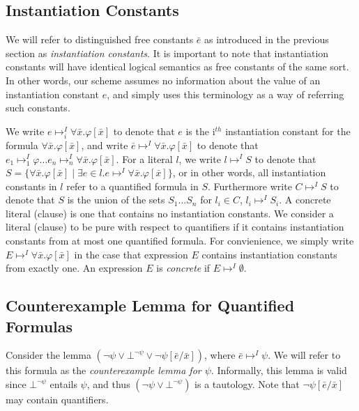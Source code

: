 \documentclass{llncs}
\begin{document}
\subsection{Instantiation Constants}

We will refer to distinguished free constants $\bar{e}$ as introduced in the previous section as \emph{instantiation constants}.
It is important to note that instantiation constants will have identical logical semantics as free constants of the same sort.
In other words, our scheme assumes no information about the value of an instantiation constant $e$, and simply uses this terminology as a way of referring such constants.

We write $e \mapsto^I_i \forall \bar{x}. \varphi[ \bar{x} ]$ to denote that $e$ is the i$^{th}$ instantiation constant for the formula $\forall \bar{x}. \varphi[ \bar{x} ] $, and write $\bar{e} \mapsto^I \forall \bar{x}. \varphi[ \bar{x} ]$ to denote that $e_1 \mapsto^I_1 \varphi \ldots e_n \mapsto^I_n \forall \bar{x}. \varphi[ \bar{x} ]$.
For a literal $l$, we write $l \mapsto^I S$ to denote that $S = \{ \forall \bar{x}. \varphi[ \bar{x} ] \mid \exists e \in l. e \mapsto^I \forall \bar{x}. \varphi[ \bar{x} ] \}$, or in other words, all instantiation constants in $l$ refer to a quantified formula in $S$.
Furthermore write $C \mapsto^I S$ to denote that $S$ is the union of the sets $S_1 \ldots S_n$ for $l_i \in C$, $l_i \mapsto^I S_i$.
A concrete literal (clause) is one that contains no instantiation constants.
We consider a literal (clause) to be pure with respect to quantifiers if it contains instantiation constants from at most one quantified formula.
For convienience, we simply write $E \mapsto^I \forall \bar{x}. \varphi[ \bar{x} ]$ in the case that expression $E$ contains instantiation constants from exactly one.
An expression $E$ is \emph{concrete} if $E \mapsto^I \emptyset$.

\subsection{Counterexample Lemma for Quantified Formulas}

Consider the lemma $( \neg \psi \vee \bot^{\neg \psi} \vee \neg \psi[\bar{e}/\bar{x}])$, where $\bar{e} \mapsto^I \psi$.
We will refer to this formula as the \emph{counterexample lemma for $\psi$}.
Informally, this lemma is valid since $\bot^{\neg \psi}$ entails $\psi$, and thus $( \neg \psi \vee \bot^{\neg \psi} )$ is a tautology.
Note that $\neg \psi[\bar{e}/\bar{x}]$ may contain quantifiers.
\end{document}
